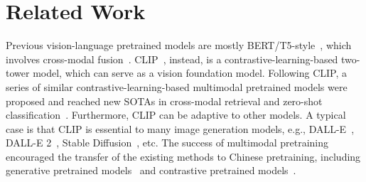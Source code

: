 \section{Related Work}

Previous vision-language pretrained models are mostly BERT/T5-style~\citep{bert, t5}, which involves cross-modal fusion~\citep{uniter, unicoder-vl, visualbert, vilbert, interbert, oscar, pixelbert, e2e-vlp, vinvl, clipvil, simvlm, ofa, albef, blip, mplug, vlmo, beit3}. 
CLIP~\citep{clip}, instead, is a contrastive-learning-based two-tower model, which can serve as a vision foundation model.  
Following CLIP, a series of similar contrastive-learning-based multimodal pretrained models were proposed and reached new SOTAs in cross-modal retrieval and zero-shot classification~\citep{align, filip, florence}. 
Furthermore, CLIP can be adaptive to other models. 
A typical case is that CLIP is essential to many image generation models, e.g., DALL-E~\citep{dalle}, DALL-E 2~\citep{dalle2}, Stable Diffusion~\citep{latent_diffusion}, etc. 
The success of multimodal pretraining encouraged the transfer of the existing methods to Chinese pretraining, including generative pretrained models~\citep{m6, wenlan, m6-t, m6-10t, ofa} and contrastive pretrained models~\citep{wenlan, wukong, r2d2, altclip}. 

